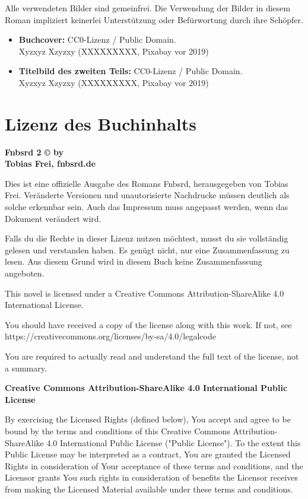 Alle verwendeten Bilder sind gemeinfrei. Die Verwendung der Bilder in diesem Roman impliziert keinerlei Unterstützung oder Befürwortung durch ihre Schöpfer.

\begin{itemize}
    \item \textbf{Buchcover:} CC0-Lizenz / Public Domain.\\ Xyzxyz Xzyzxy (XXXXXXXXX, Pixabay vor 2019) %
    \item \textbf{Titelbild des zweiten Teils:} CC0-Lizenz / Public Domain.\\ Xyzxyz Xzyzxy (XXXXXXXXX, Pixabay vor 2019) %
\end{itemize}


\chapter{Lizenz des Buchinhalts}

\textbf{Fnbsrd 2 © by\\ Tobias Frei, fnbsrd.de}

Dies ist eine offizielle Ausgabe des Romans Fnbsrd, herausgegeben von Tobias Frei. Veränderte Versionen und unautorisierte Nachdrucke müssen deutlich als solche erkennbar sein. Auch das Impressum muss angepasst werden, wenn das Dokument verändert wird.

Falls du die Rechte in dieser Lizenz nutzen möchtest, musst du sie vollständig gelesen und verstanden haben. Es genügt nicht, nur eine Zusammenfassung zu lesen. Aus diesem Grund wird in diesem Buch keine Zusammenfassung angeboten.

This novel is licensed under a Creative Commons Attribution-ShareAlike 4.0 International License.

You should have received a copy of the license along with this work. If not, see\\
https://creativecommons.org/licenses/by-sa/4.0/legalcode

You are required to actually read and understand the full text of the license, not a summary.

\begin{center}
    \large{\textbf{Creative Commons Attribution-ShareAlike 4.0 International Public License}}
\end{center}

By exercising the Licensed Rights (defined below), You accept and agree to be bound by the terms and conditions of this Creative Commons Attribution-ShareAlike 4.0 International Public License ("Public License"). To the extent this Public License may be interpreted as a contract, You are granted the Licensed Rights in consideration of Your acceptance of these terms and conditions, and the Licensor grants You such rights in consideration of benefits the Licensor receives from making the Licensed Material available under these terms and conditions.

